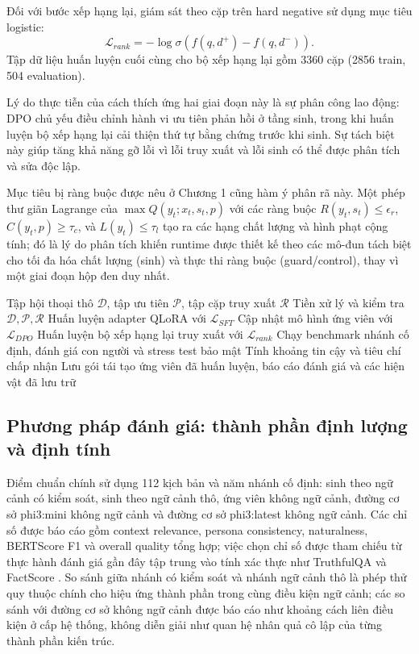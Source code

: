 ﻿\documentclass[a4paper,12pt]{article}
\begin{document}
Đối với bước xếp hạng lại, giám sát theo cặp trên hard negative sử dụng mục tiêu logistic:
\begin{equation}
\mathcal{L}_{rank} = -\log \sigma\!\left(f(q,d^+) - f(q,d^-)\right).
\end{equation}
Tập dữ liệu huấn luyện cuối cùng cho bộ xếp hạng lại gồm 3360 cặp (2856 train, 504 evaluation).

Lý do thực tiễn của cách thích ứng hai giai đoạn này là sự phân công lao động: DPO chủ yếu điều chỉnh hành vi ưu tiên phản hồi ở tầng sinh, trong khi huấn luyện bộ xếp hạng lại cải thiện thứ tự bằng chứng trước khi sinh. Sự tách biệt này giúp tăng khả năng gỡ lỗi vì lỗi truy xuất và lỗi sinh có thể được phân tích và sửa độc lập.

Mục tiêu bị ràng buộc được nêu ở Chương 1 cũng hàm ý phân rã này. Một phép thư giãn Lagrange của
\(\max Q(y_t;x_t,s_t,p)\) với các ràng buộc \(R(y_t,s_t)\le \epsilon_r\), \(C(y_t,p)\ge\tau_c\), và \(L(y_t)\le\tau_l\)
tạo ra các hạng chất lượng và hình phạt cộng tính; đó là lý do phân tích khiến runtime được thiết kế theo các mô-đun tách biệt cho tối đa hóa chất lượng (sinh) và thực thi ràng buộc (guard/control), thay vì một giai đoạn hộp đen duy nhất.

\begin{algorithm}[H]
\caption{Quy trình huấn luyện và đánh giá}
\begin{algorithmic}[1]
\Require Tập hội thoại thô \(\mathcal{D}\), tập ưu tiên \(\mathcal{P}\), tập cặp truy xuất \(\mathcal{R}\)
\State Tiền xử lý và kiểm tra \(\mathcal{D},\mathcal{P},\mathcal{R}\)
\State Huấn luyện adapter QLoRA với \(\mathcal{L}_{SFT}\)
\State Cập nhật mô hình ứng viên với \(\mathcal{L}_{DPO}\)
\EndIf
\State Huấn luyện bộ xếp hạng lại truy xuất với \(\mathcal{L}_{rank}\)
\State Chạy benchmark nhánh cố định, đánh giá con người và stress test bảo mật
\State Tính khoảng tin cậy và tiêu chí chấp nhận
\State Lưu gói tái tạo
\State \Return ứng viên đã huấn luyện, báo cáo đánh giá và các hiện vật đã lưu trữ
\end{algorithmic}
\end{algorithm}

\subsection{Phương pháp đánh giá: thành phần định lượng và định tính}

Điểm chuẩn chính sử dụng 112 kịch bản và năm nhánh cố định: sinh theo ngữ cảnh có kiểm soát, sinh theo ngữ cảnh thô, ứng viên không ngữ cảnh, đường cơ sở phi3:mini không ngữ cảnh và đường cơ sở phi3:latest không ngữ cảnh. Các chỉ số được báo cáo gồm context relevance, persona consistency, naturalness, BERTScore F1 và overall quality tổng hợp; việc chọn chỉ số được tham chiếu từ thực hành đánh giá gần đây tập trung vào tính xác thực như TruthfulQA và FactScore \cite{Lin2021TruthfulQA,Min2023FactScore}. So sánh giữa nhánh có kiểm soát và nhánh ngữ cảnh thô là phép thử quy thuộc chính cho hiệu ứng thành phần trong cùng điều kiện ngữ cảnh; các so sánh với đường cơ sở không ngữ cảnh được báo cáo như khoảng cách liên điều kiện ở cấp hệ thống, không diễn giải như quan hệ nhân quả cô lập của từng thành phần kiến trúc.
\end{document}

